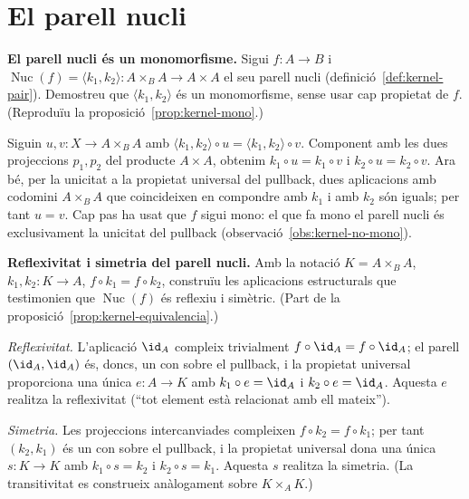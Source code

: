 \section{El parell nucli}\label{prac:parell-nucli}

\begin{exercici}
\textbf{El parell nucli és un monomorfisme.} Sigui \(f\colon A\to B\) i \(\operatorname{Nuc}(f)=\langle k_1,k_2\rangle\colon A\times_B A\to A\times A\) el seu parell nucli (definició~\ref{def:kernel-pair}). Demostreu que \(\langle k_1,k_2\rangle\) és un monomorfisme, sense usar cap propietat de \(f\). (Reproduïu la proposició~\ref{prop:kernel-mono}.)
\end{exercici}
\begin{solucio}
Siguin \(u,v\colon X\to A\times_B A\) amb \(\langle k_1,k_2\rangle\circ u=\langle k_1,k_2\rangle\circ v\). Component amb les dues projeccions \(p_1,p_2\) del producte \(A\times A\), obtenim \(k_1\circ u=k_1\circ v\) i \(k_2\circ u=k_2\circ v\). Ara bé, per la unicitat a la propietat universal del pullback, dues aplicacions amb codomini \(A\times_B A\) que coincideixen en compondre amb \(k_1\) i amb \(k_2\) són iguals; per tant \(u=v\). Cap pas ha usat que \(f\) sigui mono: el que fa mono el parell nucli és exclusivament la unicitat del pullback (observació~\ref{obs:kernel-no-mono}).
\end{solucio}

\begin{exercici}
\textbf{Reflexivitat i simetria del parell nucli.} Amb la notació \(K=A\times_B A\), \(k_1,k_2\colon K\to A\), \(f\circ k_1=f\circ k_2\), construïu les aplicacions estructurals que testimonien que \(\operatorname{Nuc}(f)\) és reflexiu i simètric. (Part de la proposició~\ref{prop:kernel-equivalencia}.)
\end{exercici}
\begin{solucio}
\emph{Reflexivitat.} L'aplicació \(\id_A\) compleix trivialment \(f\circ\id_A=f\circ\id_A\); el parell \((\id_A,\id_A)\) és, doncs, un con sobre el pullback, i la propietat universal proporciona una única \(e\colon A\to K\) amb \(k_1\circ e=\id_A\) i \(k_2\circ e=\id_A\). Aquesta \(e\) realitza la reflexivitat (\enquote{tot element està relacionat amb ell mateix}).

\emph{Simetria.} Les projeccions intercanviades compleixen \(f\circ k_2=f\circ k_1\); per tant \((k_2,k_1)\) és un con sobre el pullback, i la propietat universal dona una única \(s\colon K\to K\) amb \(k_1\circ s=k_2\) i \(k_2\circ s=k_1\). Aquesta \(s\) realitza la simetria. (La transitivitat es construeix anàlogament sobre \(K\times_A K\).)
\end{solucio}

